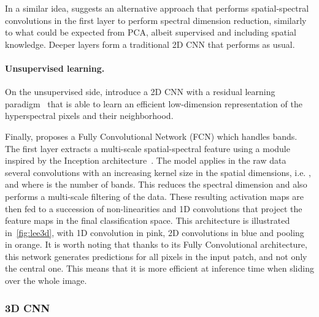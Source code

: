 \documentclass[journal]{IEEEtran}
\begin{document}
In a similar idea, \cite{luo_hsi-cnn_2018} suggests an alternative approach that performs spatial-spectral convolutions in the first layer to perform spectral dimension reduction, similarly to what could be expected from PCA, albeit supervised and including spatial knowledge. Deeper layers form a traditional 2D CNN that performs as usual.

\paragraph{Unsupervised learning.} On the unsupervised side, \cite{mou_unsupervised_2018} introduce a 2D CNN with a residual learning paradigm~\cite{he_deep_2016} that is able to learn an efficient low-dimension representation of the hyperspectral pixels and their neighborhood.

Finally, \cite{lee_kwon-contextualCNN4HSI_TIP2017} proposes a Fully Convolutional Network (FCN) which handles  bands. The first layer extracts a multi-scale spatial-spectral feature using a module inspired by the Inception architecture~\cite{szegedy_going_2015}. The model applies in the raw data several convolutions with an increasing kernel size in the spatial dimensions, i.e. ,  and 
where  is the number of bands. This reduces the spectral dimension and also performs a multi-scale filtering of the data. These resulting activation maps are then fed to a succession of non-linearities and 1D convolutions that project the feature maps in the final classification space. This architecture is illustrated in~\cref{fig:lee3d}, with 1D convolution in pink, 2D convolutions in blue and pooling in orange. It is worth noting that thanks to its Fully Convolutional architecture, this network generates predictions for all pixels in the input patch, and not only the central one. This means that it is more efficient at inference time when sliding over the whole image.





\subsubsection{3D CNN} 
\end{document}
